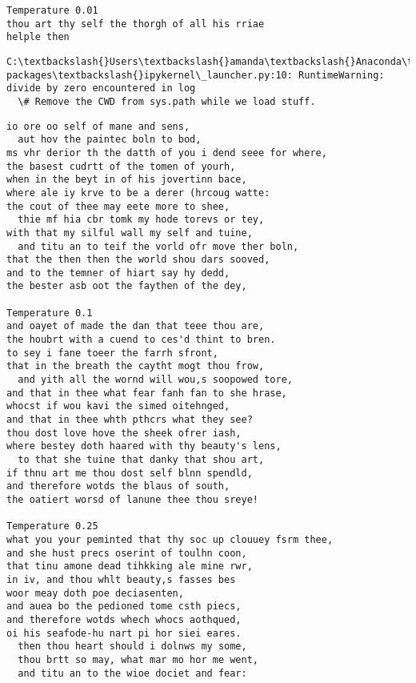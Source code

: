 \documentclass[11pt]{article}
\begin{document}
    \begin{Verbatim}[commandchars=\\\{\}]
Temperature 0.01
thou art thy self the thorgh of all his rriae
helple then
    \end{Verbatim}

    \begin{Verbatim}[commandchars=\\\{\}]
C:\textbackslash{}Users\textbackslash{}amanda\textbackslash{}Anaconda\textbackslash{}lib\textbackslash{}site-packages\textbackslash{}ipykernel\_launcher.py:10: RuntimeWarning: divide by zero encountered in log
  \# Remove the CWD from sys.path while we load stuff.

    \end{Verbatim}

    \begin{Verbatim}[commandchars=\\\{\}]
 io ore oo self of mane and sens,
  aut hov the paintec boln to bod,
ms vhr derior th the datth of you i dend seee for where,
the basest cudrtt of the tomen of yourh,
when in the beyt in of his jovertinn bace,
where ale iy krve to be a derer (hrcoug watte:
the cout of thee may eete more to shee,
  thie mf hia cbr tomk my hode torevs or tey,
with that my silful wall my self and tuine,
  and titu an to teif the vorld ofr move ther boln,
that the then then the world shou dars sooved,
and to the temner of hiart say hy dedd,
the bester asb oot the faythen of the dey,

Temperature 0.1
and oayet of made the dan that teee thou are,
the houbrt with a cuend to ces'd thint to bren.
to sey i fane toeer the farrh sfront,
that in the breath the caytht mogt thou frow,
  and yith all the wornd will wou,s soopowed tore,
and that in thee what fear fanh fan to she hrase,
whocst if wou kavi the simed oitehnged,
and that in thee whth pthcrs what they see?
thou dost love hove the sheek ofrer iash,
where bestey doth haared with thy beauty's lens,
  to that she tuine that danky that shou art,
if thnu art me thou dost self blnn spendld,
and therefore wotds the blaus of south,
the oatiert worsd of lanune thee thou sreye!

Temperature 0.25
what you your peminted that thy soc up clouuey fsrm thee,
and she hust precs oserint of toulhn coon,
that tinu amone dead tihkking ale mine rwr,
in iv, and thou whlt beauty,s fasses bes
woor meay doth poe deciasenten,
and auea bo the pedioned tome csth piecs,
and therefore wotds whech whocs aothqued,
oi his seafode-hu nart pi hor siei eares.
  then thou heart should i dolnws my some,
  thou brtt so may, what mar mo hor me went,
  and titu an to the wioe dociet and fear:


\end{Verbatim}
\end{document}
